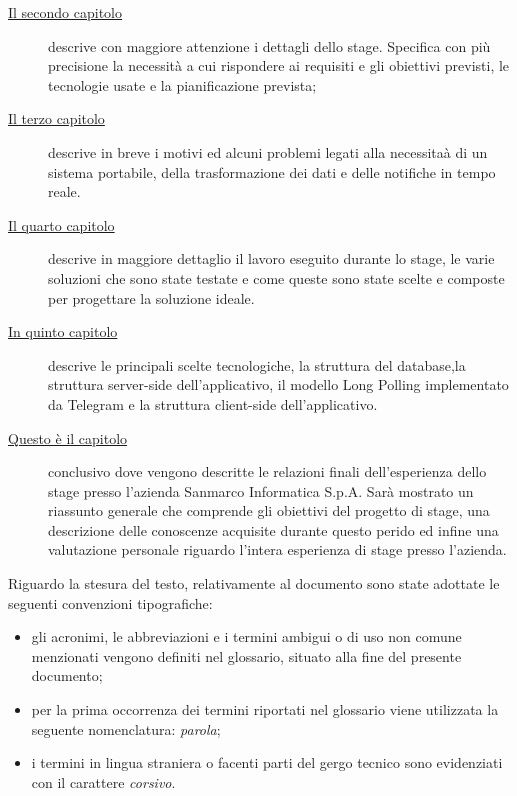 \begin{description}
    \item[{\hyperref[cap:processi-metodologie]{Il secondo capitolo}}] descrive con maggiore attenzione i dettagli dello stage. Specifica con più precisione la necessità a cui rispondere ai requisiti e gli obiettivi previsti, le tecnologie usate e la pianificazione prevista;
    
    \item[{\hyperref[cap:definizione-problema]{Il terzo capitolo}}] descrive in breve i motivi ed alcuni problemi legati alla necessitaà di un sistema portabile, della trasformazione dei dati e delle notifiche in tempo reale.
    
    \item[{\hyperref[cap:analisi-requisiti]{Il quarto capitolo}}] descrive in maggiore dettaglio il lavoro eseguito durante lo stage, le varie soluzioni che sono state testate e come queste sono state scelte e composte per progettare la soluzione ideale.
    
    \item[{\hyperref[cap:progettazione-codifica]{In quinto capitolo}}] descrive le principali scelte tecnologiche, la struttura del database,la struttura server-side dell'applicativo, il modello Long Polling implementato da Telegram e la struttura client-side dell'applicativo.
    
    \item[{\hyperref[cap:conclusioni]{Questo è il capitolo}}] conclusivo dove vengono descritte le relazioni finali dell'esperienza dello stage presso l'azienda Sanmarco Informatica S.p.A. Sarà mostrato un riassunto generale che comprende gli obiettivi del progetto di stage, una descrizione delle conoscenze acquisite durante questo perido ed infine una valutazione personale riguardo l'intera esperienza di stage presso l'azienda. 
\end{description}

Riguardo la stesura del testo, relativamente al documento sono state adottate le seguenti convenzioni tipografiche:
\begin{itemize}
	\item gli acronimi, le abbreviazioni e i termini ambigui o di uso non comune menzionati vengono definiti nel glossario, situato alla fine del presente documento;
	\item per la prima occorrenza dei termini riportati nel glossario viene utilizzata la seguente nomenclatura: \emph{parola}\glsfirstoccur;
	\item i termini in lingua straniera o facenti parti del gergo tecnico sono evidenziati con il carattere \emph{corsivo}.
\end{itemize}